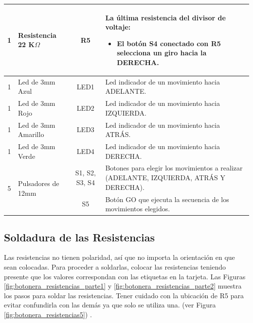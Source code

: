 \documentclass{article}
\begin{document}
\begin{longtable}{|c|l|c|m{}|}
        1 & Resistencia 22 K$\Omega$ & R5 & La última resistencia  del divisor de voltaje: 
        \begin{itemize}
            \item El botón S4 conectado con R5 selecciona un giro hacia la DERECHA.
        \end{itemize}\\ \hline
        1 & Led de 3mm Azul & LED1 & Led indicador de un movimiento hacia ADELANTE. \\ \hline
        1 & Led de 3mm Rojo & LED2 & Led indicador de un movimiento hacia IZQUIERDA. \\ \hline
        1 & Led de 3mm Amarillo & LED3 & Led indicador de un movimiento hacia ATRÁS. \\ \hline
        1 & Led de 3mm Verde & LED4 & Led indicador de un movimiento hacia DERECHA. \\ \hline
        \multirow{2}{*}{5}
        & \multirow{2}{*}{Pulsadores de 12mm} & S1, S2, S3, S4 & Botones para elegir los movimientos a realizar (ADELANTE, IZQUIERDA, ATRÁS Y DERECHA).\\ \cline{3-4}
        & & S5 & Botón GO que ejecuta la secuencia de los movimientos elegidos.\\ \hline 
\end{longtable}

\subsection{Soldadura de las Resistencias}
Las resistencias no tienen polaridad, así que no importa la orientación en que sean colocadas. Para proceder a soldarlas, colocar las resistencias teniendo presente que los valores correspondan con las etiquetas en la tarjeta. Las Figuras \ref{fig:botonera_resistencias_parte1} y \ref{fig:botonera_resistencias_parte2} muestra los pasos para soldar las resistencias. Tener cuidado con la ubicación de R5 para evitar confundirla con las demás ya que solo se utiliza una. (ver Figura \ref{fig:botonera_resistencias5}) .
\end{document}
